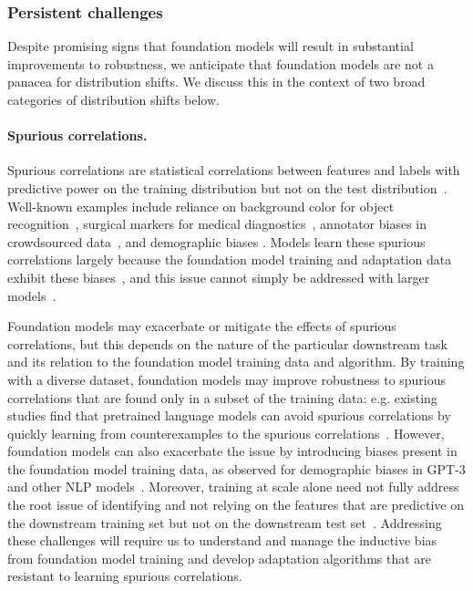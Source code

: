 \subsubsection{Persistent challenges}
\label{sec:robustness-challenges}

Despite promising signs that foundation models will result in substantial improvements to robustness, we anticipate that foundation models are not a panacea for distribution shifts. We discuss this in the context of two broad categories of distribution shifts below.

\paragraph{Spurious correlations.} Spurious correlations are statistical correlations between features and labels with predictive power on the training distribution but not on the test distribution~\citep{heinze2017conditional, arjovsky2019invariant, sagawa2020group}. Well-known examples include reliance on background color for object recognition~\citep{xiao2020noise}, surgical markers for medical diagnostics~\citep{winkler2019derm}, annotator biases in crowdsourced data~\citep{tsuchiya2018performance,gururangan2018annotation,poliak2018hypothesis,geva-etal-2019-modeling}, and demographic biases \citep{abid2021,stereoset,gehman-etal-2020-realtoxicityprompts}. Models learn these spurious correlations largely because the foundation model training and adaptation data exhibit these biases~\citep{nagarajan2020understanding,gehman-etal-2020-realtoxicityprompts}, and this issue cannot simply be addressed with larger models~\citep{sagawa2020overparameterization}.

Foundation models may exacerbate or mitigate the effects of spurious correlations, but this depends on the nature of the particular downstream task and its relation to the foundation model training data and algorithm. By training with a diverse dataset, foundation models may improve robustness to spurious correlations that are found only in a subset of the training data: e.g. existing studies find that pretrained language models can avoid spurious correlations by quickly learning from counterexamples to the spurious correlations~\citep{tu2020empirical}. However, foundation models can also exacerbate the issue by introducing biases present in the foundation model training data, as observed for demographic biases in GPT-3 and other NLP models~\citep{abid2021,stereoset,gehman-etal-2020-realtoxicityprompts}. Moreover, training at scale alone need not fully address the root issue of identifying and not relying on the features that are predictive on the downstream training set but not on the downstream test set~\citep{heinze2017conditional}. Addressing these challenges will require us to understand and manage the inductive bias from foundation model training and develop adaptation algorithms that are resistant to learning spurious correlations.

